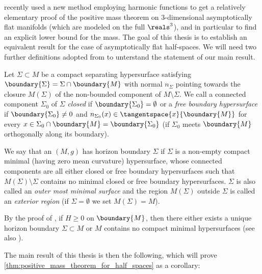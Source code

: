 \documentclass[titlepage,numbers=noenddot,oneside,%
cleardoublepage=empty,paper=a4,fontsize=11pt,%
english,%
]{scrartcl}
\begin{document}
\Textcite{brayHarmonicFunctionsMass2019} recently used a new method employing harmonic functions to get a relatively elementary proof of the positive mass theorem on 3-dimensional asymptotically flat manifolds (which are modeled on the full \( \reals^3 \)),  and in particular to find an explicit lower bound for the mass. The goal of this thesis is to establish an equivalent result for the case of asymptotically flat half-spaces. We will need two further definitions adopted from \cite{eichmairDoublingAsymptoticallyFlat2023} to unterstand the statement of our main result.
\begin{definition}
    Let \( \Sigma\subset M  \) be a compact separating hypersurface satisfying \( \boundary{\Sigma}={\Sigma\cap\boundary{M}} \) with normal \( n_\Sigma \) pointing towards the closure \( M(\Sigma) \) of the non-bounded component of \( M\setminus \Sigma \). We call a connected component \( \Sigma_0 \) of \( \Sigma \) \emph{closed} if \( \boundary{\Sigma_0}=\emptyset \) or a \emph{free boundary hypersurface} if \( \boundary{\Sigma_0}\neq 0 \) and \( n_{\Sigma_0}(x)\in \tangentspace{x}{\boundary{M}} \) for every \( x\in \Sigma_0\cap \boundary{M}=\boundary{\Sigma_0} \) (\ie if \( \Sigma_0 \) meets \( \boundary{M} \) orthogonally along its boundary).

    We say that an \( (M,g) \) has horizon boundary \( \Sigma \) if \( \Sigma \) is a non-empty compact minimal (\ie having zero mean curvature) hypersurface, whose connected components are all either closed or free boundary hypersurfaces such that \( M(\Sigma)\setminus \Sigma \) contains no minimal closed or free boundary hypersurfaces. \( \Sigma \) is also called an \emph{outer most minimal surface} and the region \( M(\Sigma) \) outside \( \Sigma \) is called an \emph{exterior region} (if \( \Sigma=\emptyset \) we set \( M(\Sigma)=M \)).
\end{definition}
\begin{remark}\label{rem:exterior_region_existence}
    By the proof of \cite[Lemma 2.3]{koerberRiemannianPenroseInequality2020}, if \( H\geq 0 \) on \( \boundary{M} \), then there either exists a unique horizon boundary \( \Sigma\subset M \) or \( M \) contains no compact minimal hypersurfaces (see also \cite[Remark 3]{eichmairDoublingAsymptoticallyFlat2023}).
\end{remark}
The main result of this thesis is then the following, which will prove \cref{thm:positive_mass_theorem_for_half_spaces} as a corollary:
\end{document}
